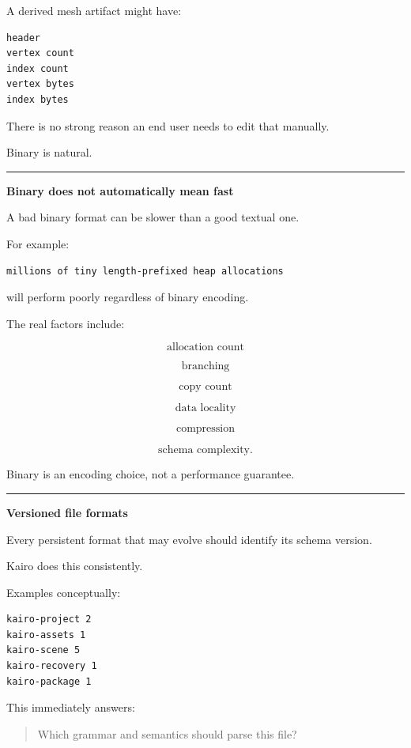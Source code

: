 A derived mesh artifact might have:

\begin{verbatim}
header
vertex count
index count
vertex bytes
index bytes
\end{verbatim}

There is no strong reason an end user needs to edit that manually.

Binary is natural.

\begin{center}\rule{0.5\linewidth}{0.5pt}\end{center}

\textbf{Binary does not automatically mean fast}

A bad binary format can be slower than a good textual one.

For example:

\begin{verbatim}
millions of tiny length-prefixed heap allocations
\end{verbatim}

will perform poorly regardless of binary encoding.

The real factors include:

\[
\text{allocation count}
\]

\[
\text{branching}
\]

\[
\text{copy count}
\]

\[
\text{data locality}
\]

\[
\text{compression}
\]

\[
\text{schema complexity}.
\]

Binary is an encoding choice, not a performance guarantee.

\begin{center}\rule{0.5\linewidth}{0.5pt}\end{center}

\textbf{Versioned file formats}

Every persistent format that may evolve should identify its schema version.

Kairo does this consistently.

Examples conceptually:

\begin{verbatim}
kairo-project 2
kairo-assets 1
kairo-scene 5
kairo-recovery 1
kairo-package 1
\end{verbatim}

This immediately answers:

\begin{quote}
Which grammar and semantics should parse this file?
\end{quote}

